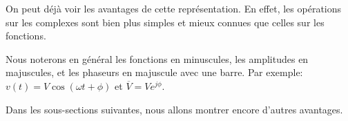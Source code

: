 On peut déjà voir les avantages de cette représentation.
En effet,
les opérations sur les complexes sont bien plus simples et mieux connues
que celles sur les fonctions.

Nous noterons en général les fonctions en minuscules,
les amplitudes en majuscules,
et les phaseurs en majuscule avec une barre.
Par exemple: $v(t) = V\cos(\omega t + \phi)$ et
$\overline{V} = Ve^{j\phi}$.

Dans les sous-sections suivantes, nous allons montrer
encore d'autres avantages.
